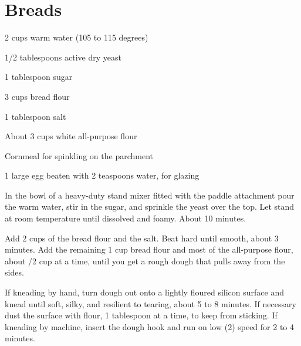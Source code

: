 \chapter{Breads}


%
%
%
%
\newpage



\begin{IngredientsAndSteps}
    \ListIngredientsAndSteps
    {
        2 cups warm water (105 to 115 degrees)

        1/2 tablespoons active dry yeast

        1 tablespoon sugar

        3 cups bread flour

        1 tablespoon salt

        About 3 cups white all-purpose flour

        Cornmeal for spinkling on the parchment

        1 large egg beaten with 2 teaspoons water, for glazing
    }
    {
        In the bowl of a heavy-duty stand mixer fitted with the paddle
        attachment pour the warm water, stir in the sugar, and sprinkle the
        yeast over the top. Let stand at room temperature until dissolved
        and foamy. About 10 minutes.

        Add 2 cups of the bread flour and the salt. Beat hard until smooth,
        about 3 minutes. Add the remaining 1 cup bread flour and most of the
        all-purpose flour, about /2 cup at a time, until you get a
        rough dough that pulls away from the sides.

        If kneading by hand, turn dough out onto a lightly floured silicon
        surface and knead until soft, silky, and resilient to tearing, about
        5 to 8 minutes. If necessary dust the surface with flour, 1 tablespoon
        at a time, to keep from sticking. If kneading by machine, insert the
        dough hook and run on low (2) speed for 2 to 4 minutes.

}
\end{IngredientsAndSteps}

